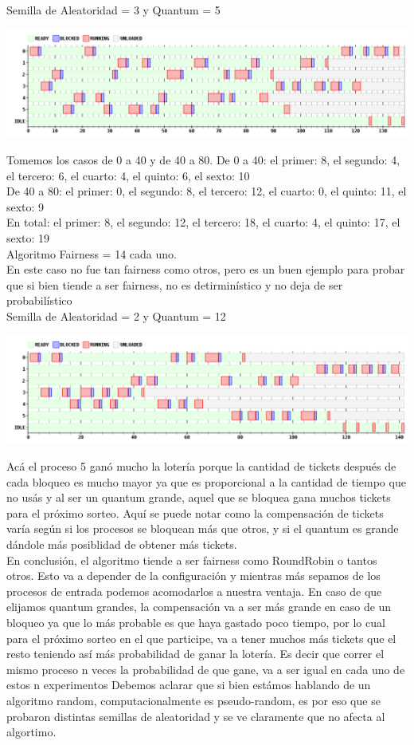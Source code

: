 Semilla de Aleatoridad = 3 y Quantum = 5
\begin {center}
\includegraphics[width=16cm]{../simusched/outputs/ej8/sl-ej8-3-5.png}
\end {center}
Tomemos los casos de 0 a 40 y de 40 a 80.
De 0 a 40: el primer: 8, el segundo: 4, el tercero: 6, el cuarto: 4, el quinto: 6, el sexto: 10 \\
De 40 a 80: el primer: 0, el segundo: 8, el tercero: 12, el cuarto: 0, el quinto: 11, el sexto: 9 \\
En total: el primer: 8, el segundo: 12, el tercero: 18, el cuarto: 4, el quinto: 17, el sexto: 19 \\
Algoritmo Fairness = 14 cada uno.\\
En este caso no fue tan fairness como otros, pero es un buen ejemplo para probar que si bien tiende a ser fairness, no es detirminístico y no deja de ser probabilístico\\
Semilla de Aleatoridad = 2 y Quantum = 12
\begin {center}
\includegraphics[width=16cm]{../simusched/outputs/ej8/sl-ej8-2-12.png}
\end {center}
Acá el proceso 5 ganó mucho la lotería porque la cantidad de tickets después de cada bloqueo es mucho mayor ya que es proporcional a la cantidad de tiempo que no usás y al ser un quantum grande, aquel que se bloquea gana muchos tickets para el próximo sorteo. Aquí se puede notar como la compensación de tickets varía según si los procesos se bloquean más que otros, y si el quantum es grande dándole más posiblidad de obtener más tickets.\\


En conclusión, el algoritmo tiende a ser fairness como RoundRobin o tantos otros. Esto va a depender de la configuración y mientras más sepamos de los procesos de entrada podemos acomodarlos a nuestra ventaja.
En caso de que elijamos quantum grandes, la compensación va a ser más grande en caso de un bloqueo ya que lo más probable es que haya gastado poco tiempo, por lo cual para el próximo sorteo en el que participe, va a tener
muchos más tickets que el resto teniendo así más probabilidad de ganar la lotería.
Es decir que correr el mismo proceso n veces la probabilidad de que gane, va a ser igual en cada uno de estos n experimentos
Debemos aclarar que si bien estámos hablando de un algoritmo random, computacionalmente es pseudo-random, es por eso que se probaron distintas semillas de aleatoridad y se ve claramente que no afecta al algortimo.
